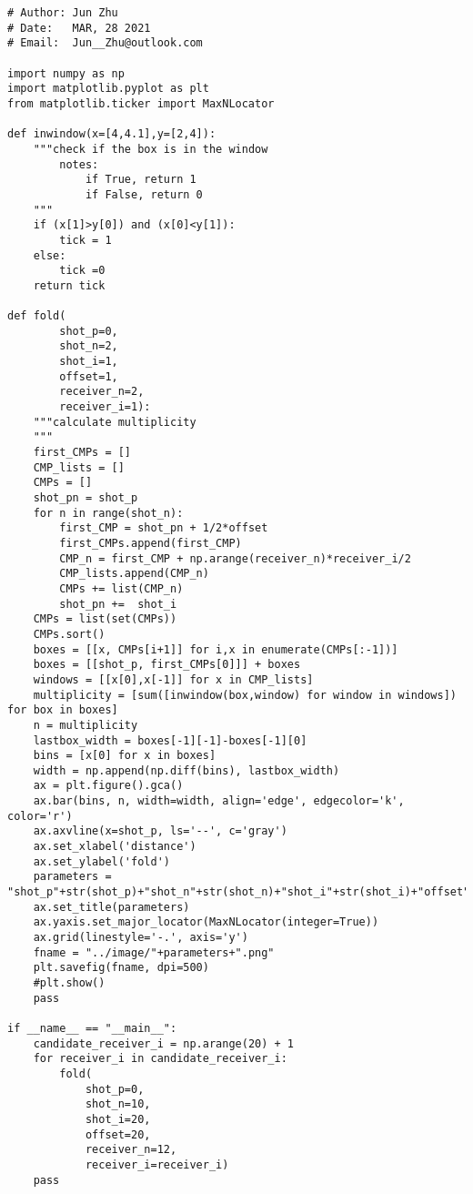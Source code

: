 \documentclass{article}
\begin{document}
\begin{lstlisting}
# Author: Jun Zhu
# Date:   MAR, 28 2021
# Email:  Jun__Zhu@outlook.com

import numpy as np
import matplotlib.pyplot as plt
from matplotlib.ticker import MaxNLocator

def inwindow(x=[4,4.1],y=[2,4]):
	"""check if the box is in the window
		notes:
			if True, return 1
			if False, return 0
	"""
	if (x[1]>y[0]) and (x[0]<y[1]):
		tick = 1
	else:
		tick =0
	return tick

def fold(
		shot_p=0,
		shot_n=2,
		shot_i=1,
		offset=1,
		receiver_n=2,
		receiver_i=1):
	"""calculate multiplicity
	"""
	first_CMPs = []
	CMP_lists = []
	CMPs = []
	shot_pn = shot_p
	for n in range(shot_n):
		first_CMP = shot_pn + 1/2*offset
		first_CMPs.append(first_CMP)
		CMP_n = first_CMP + np.arange(receiver_n)*receiver_i/2
		CMP_lists.append(CMP_n)
		CMPs += list(CMP_n)
		shot_pn +=  shot_i
	CMPs = list(set(CMPs))
	CMPs.sort()
	boxes = [[x, CMPs[i+1]] for i,x in enumerate(CMPs[:-1])]
	boxes = [[shot_p, first_CMPs[0]]] + boxes
	windows = [[x[0],x[-1]] for x in CMP_lists]
	multiplicity = [sum([inwindow(box,window) for window in windows]) for box in boxes]
	n = multiplicity
	lastbox_width = boxes[-1][-1]-boxes[-1][0]
	bins = [x[0] for x in boxes]
	width = np.append(np.diff(bins), lastbox_width)
	ax = plt.figure().gca()
	ax.bar(bins, n, width=width, align='edge', edgecolor='k', color='r')
	ax.axvline(x=shot_p, ls='--', c='gray')
	ax.set_xlabel('distance')
	ax.set_ylabel('fold')
	parameters = "shot_p"+str(shot_p)+"shot_n"+str(shot_n)+"shot_i"+str(shot_i)+"offset"+str(offset)+"receiver_n"+str(receiver_n)+"receiver_i"+str(receiver_i)
	ax.set_title(parameters)
	ax.yaxis.set_major_locator(MaxNLocator(integer=True))
	ax.grid(linestyle='-.', axis='y')
	fname = "../image/"+parameters+".png"
	plt.savefig(fname, dpi=500)
	#plt.show()
	pass

if __name__ == "__main__":
	candidate_receiver_i = np.arange(20) + 1
	for receiver_i in candidate_receiver_i:
		fold(
			shot_p=0,
			shot_n=10,
			shot_i=20,
			offset=20,
			receiver_n=12,
			receiver_i=receiver_i)
	pass

	\end{lstlisting}
\end{document}
